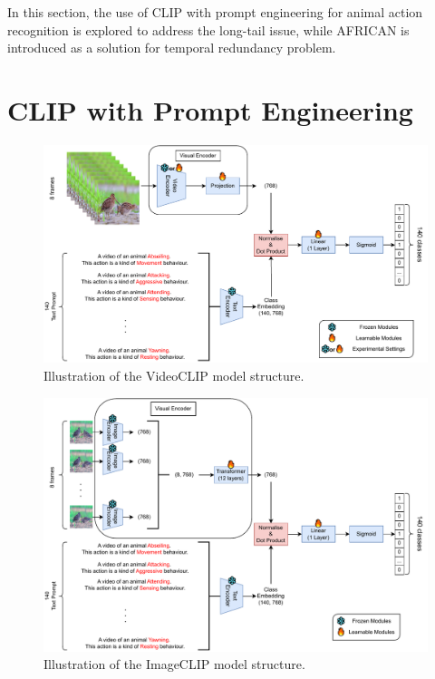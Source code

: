In this section, the use of CLIP with prompt engineering for animal action recognition is explored to address the long-tail issue, while AFRICAN is introduced as a solution for temporal redundancy problem. 

\section{CLIP with Prompt Engineering}

\begin{figure}[ht]
    \centering
    \includegraphics[width=1.0\textwidth]{assets/charts/3_1_ModelStructureVC}
    \caption[VideoCLIP model structure]{Illustration of the VideoCLIP model structure.}
    \label{fig:modelstructure_vc}
\end{figure}

\begin{figure}[ht]
    \centering
    \includegraphics[width=1.0\textwidth]{assets/charts/3_2_ModelStructureIC}
    \caption[ImageCLIP Model Structure]{Illustration of the ImageCLIP model structure.}
    \label{fig:modelstructure_ic}
\end{figure}

